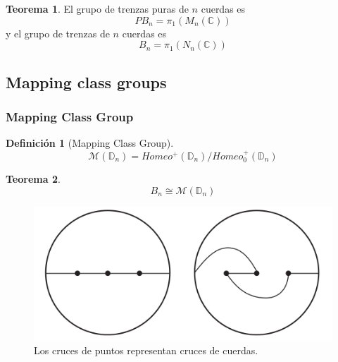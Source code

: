 \documentclass{beamer}
\theoremstyle{definition}
\newtheorem{teorema}{Teorema}
\newtheorem{defi}{Definición}
\newcommand{\C}{\mathbb{C}}
\newcommand{\D}{\mathbb{D}}
\begin{document}
\begin{frame}

\begin{teorema}
El grupo de trenzas puras de $n$ cuerdas es
$$PB_n=\pi_1(M_n(\C))$$
y el grupo de trenzas de $n$ cuerdas es
$$B_n=\pi_1(N_n(\C))$$
\end{teorema}
\end{frame}

\subsection{Mapping class groups}



\begin{frame}
\frametitle{Mapping Class Group}
\begin{defi}[Mapping Class Group] %
$$\mathcal{M}(\D_n)=Homeo^+(\D_n)/Homeo^+_0(\D_n)$$
\end{defi}
\begin{teorema}
$$B_n\cong \mathcal{M}(\D_n)$$
\end{teorema}
\end{frame}
\begin{frame}
\begin{figure}[h!]
\includegraphics[scale=0.6]{Imagenes/twist}
\caption{Los cruces de puntos representan cruces de cuerdas.}
\end{figure}
\end{frame}
\end{document}
